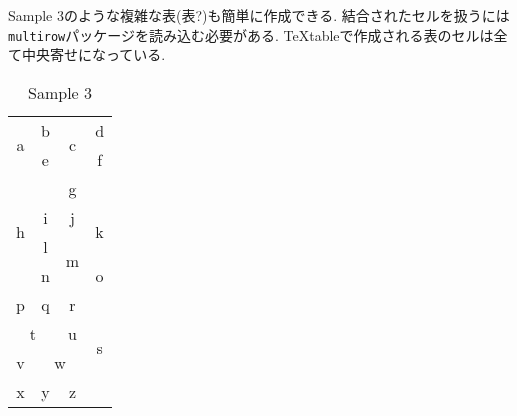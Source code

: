\documentclass{jsarticle}
\begin{document}
\newpage
Sample 3のような複雑な表(表?)も簡単に作成できる.
結合されたセルを扱うには\verb|multirow|パッケージを読み込む必要がある.
TeXtableで作成される表のセルは全て中央寄せになっている.
\vspace{-0.5em}
\begin{table}[htb]
	\captionsetup{labelformat=empty,labelsep=none}
	\caption{Sample 3}
	\label{sample3}
	\centering
	\begin{tabular}{|c|c|c|c|}\hline
		\multicolumn{1}{|c|}{\multirow{3}{*}{a}}	&b	&\multicolumn{1}{|c|}{\multirow{2}{*}{c}}	&d	\\ \cline{2-2}\cline{4-4}
		\multicolumn{1}{|c|}{}	&e	&\multicolumn{1}{|c|}{}	&f	\\ \cline{2-4}
		\multicolumn{1}{|c|}{}	&\multicolumn{3}{|c|}{\multirow{2}{*}{g}}	\\ \cline{1-1}
		\multicolumn{1}{|c|}{\multirow{4}{*}{h}}	&\multicolumn{3}{|c|}{}	\\ \cline{2-4}
		\multicolumn{1}{|c|}{}	&i	&j	&\multicolumn{1}{|c|}{\multirow{2}{*}{k}}	\\ \cline{2-3}
		\multicolumn{1}{|c|}{}	&l	&\multicolumn{1}{|c|}{\multirow{2}{*}{m}}	&\multicolumn{1}{|c|}{}	\\ \cline{2-2}\cline{4-4}
		\multicolumn{1}{|c|}{}	&n	&\multicolumn{1}{|c|}{}	&o	\\ \hline
		p	&q	&\multicolumn{1}{|c|}{\multirow{2}{*}{r}}	&\multicolumn{1}{|c|}{\multirow{5}{*}{s}}	\\ \cline{1-2}
		\multicolumn{2}{|c|}{\multirow{2}{*}{t}}	&\multicolumn{1}{|c|}{}	&\multicolumn{1}{|c|}{}	\\ \cline{3-3}
		\multicolumn{2}{|c|}{}	&u	&\multicolumn{1}{|c|}{}	\\ \cline{1-3}
		v	&\multicolumn{2}{|c|}{\multirow{1}{*}{w}}	&\multicolumn{1}{|c|}{}	\\ \cline{1-3}
		x	&y	&z	&\multicolumn{1}{|c|}{}	\\ \hline
	\end{tabular}
\end{table}
\end{document}
